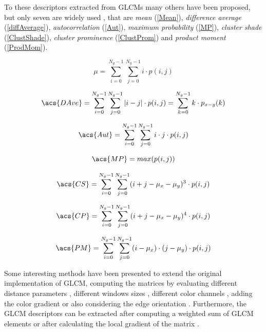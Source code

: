 To these descriptors extracted from GLCMs many others have been proposed, but only seven are widely used \cite{Soh, Clausi}, that are \textit{mean} (\ref {Mean}), \textit{difference average} (\ref{diffAverage}), \textit{autocorrelation} (\ref{Aut}), \textit{maximum probability} (\ref{MP}), \textit{cluster shade} (\ref{ClustShade}),  \textit{cluster prominence} (\ref {ClustProm}) and \textit{product moment} (\ref {ProdMom}). 

\begin{equation}\label{Mean}
{\mu}=\sum_{i=0}^{N_{g}-1}\sum_{j=0}^{N_{g}-1} i \cdot p(i,j)
\end{equation}

\begin{equation}\label{diffAverage}
\acs{DAve}= \sum_{i=0}^{N_{g}-1}\sum_{j=0}^{N_{g}-1}  |i-j| \cdot p(i,j) = \sum_{k=0}^{N_{g}-1} k \cdot p_{x-y}(k)
\end{equation}

\begin{equation}\label{Aut}
\acs{Aut}=\sum_{i=0}^{N_{g}-1}\sum_{j=0}^{N_{g}-1} i \cdot j \cdot p(i,j)
\end{equation}

\begin{equation}\label{MP}
\acs{MP}=max(p(i,j))
\end{equation}

\begin{equation}\label{ClustShade}
\acs{CS}=\sum_{i=0}^{N_{g}-1}\sum_{j=0}^{N_{g}-1}  (i + j - \mu_x - \mu_y)^3 \cdot p(i,j)
\end{equation}

\begin{equation}\label{ClustProm}
\acs{CP}=\sum_{i=0}^{N_{g}-1}\sum_{j=0}^{N_{g}-1}  (i + j - \mu_x - \mu_y)^4 \cdot p(i,j)
\end{equation}

\begin{equation}\label{ProdMom}
\acs{PM}=\sum_{i=0}^{N_{g}-1}\sum_{j=0}^{N_{g}-1}  (i - \mu_x) \cdot (j - \mu_y) \cdot p(i,j)
\end{equation}

Some interesting methods have been presented to extend the original implementation of GLCM, computing the matrices by evaluating different distance parameters \cite{Gelz}, different windows sizes \cite{HuY}, different color channels \cite{Benco}, adding the color gradient \cite{Gong} or also considering the edge orientation \cite{Mitrea}. Furthermore, the GLCM descriptors can be extracted after computing a weighted sum of GLCM elements \cite{Walker} or after calculating the local gradient of the matrix \cite{Chen}. 

